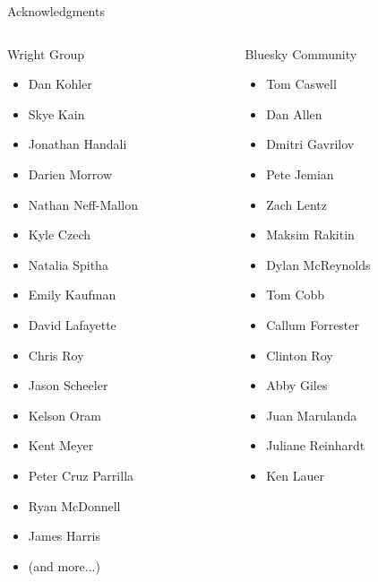 \documentclass{presentation}
\begin{document}
\begin{frame}{Acknowledgments}
	\fontsize{8pt}{9pt}\selectfont
  \begin{columns}
    \begin{column}{0.33\textwidth}
	    Wright Group
      \begin{itemize}
	      \item Dan Kohler
        \item Skye Kain
        \item Jonathan Handali
        \item Darien Morrow
        \item Nathan Neff-Mallon
        \item Kyle Czech         
        \item Natalia Spitha
	\item Emily Kaufman
	\item David Lafayette
	\item Chris Roy
	\item Jason Scheeler
	\item Kelson Oram
	\item Kent Meyer
	\item Peter Cruz Parrilla
	\item Ryan McDonnell
	\item James Harris
        \item (and more...)
      \end{itemize}
    \end{column}
    \begin{column}{0.33\textwidth}
	Bluesky Community
	    \begin{itemize}
		    \item Tom Caswell
		    \item Dan Allen
		    \item Dmitri Gavrilov
		    \item Pete Jemian
		    \item Zach Lentz
		    \item Maksim Rakitin
		    \item Dylan McReynolds
		    \item Tom Cobb
		    \item Callum Forrester
		    \item Clinton Roy
		    \item Abby Giles
		    \item Juan Marulanda
		    \item Juliane Reinhardt
		    \item Ken Lauer

\end{itemize}
\end{column}
\end{columns}
\end{frame}
\end{document}
